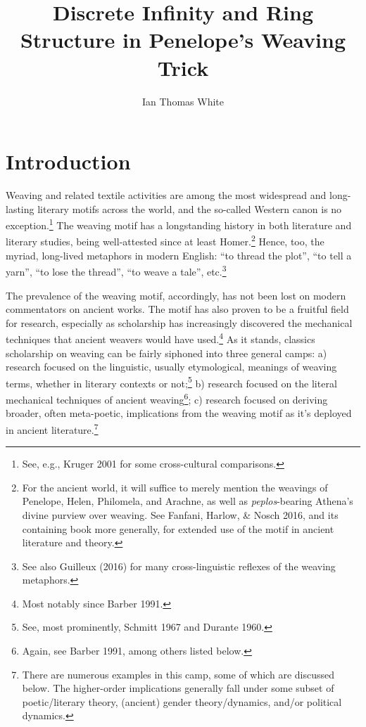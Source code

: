 \documentclass[12pt]{article}
\title{Discrete Infinity and Ring Structure in Penelope's Weaving Trick}
\author{Ian Thomas White}
\date{}
\makeatletter
\renewcommand{\maketitle}
{
\begin{flushleft}
\textbf{{\large\@title}}
\newline
\@author
\end{flushleft}
}
\makeatother
\begin{document}
\thispagestyle{empty}

\begin{singlespacing}
\maketitle
\tableofcontents
\end{singlespacing}

\newpage

\section{Introduction}\label{intro}

Weaving and related textile activities are among the most widespread and long-lasting literary motifs across the world, and the so-called Western canon is no exception.\footnote{ See, e.g., Kruger 2001 for some cross-cultural comparisons.} The weaving motif has a longstanding history in both literature and literary studies, being well-attested since at least Homer.\footnote{ For the ancient world, it will suffice to merely mention the weavings of Penelope, Helen, Philomela, and Arachne, as well as \textit{peplos}-bearing Athena's divine purview over weaving. See Fanfani, Harlow, \& Nosch 2016, and its containing book more generally, for extended use of the motif in ancient literature and theory.} Hence, too, the myriad, long-lived metaphors in modern English: ``to thread the plot'', ``to tell a yarn'', ``to lose the thread'', ``to weave a tale'', etc.\footnote{ See also Guilleux (2016) for many cross-linguistic reflexes of the weaving metaphors.}

The prevalence of the weaving motif, accordingly, has not been lost on modern commentators on ancient works. The motif has also proven to be a fruitful field for research, especially as scholarship has increasingly discovered the mechanical techniques that ancient weavers would have used.\footnote{ Most notably since Barber 1991.} As it stands, classics scholarship on weaving can be fairly siphoned into three general camps: a) research focused on the linguistic, usually etymological, meanings of weaving terms, whether in literary contexts or not;\footnote{ See, most prominently, Schmitt 1967 and Durante 1960.} b) research focused on the literal mechanical techniques of ancient weaving\footnote{ Again, see Barber 1991, among others listed below.}; c) research focused on deriving broader, often meta-poetic, implications from the weaving motif as it's deployed in ancient literature.\footnote{ There are numerous examples in this camp, some of which are discussed below. The higher-order implications generally fall under some subset of poetic/literary theory, (ancient) gender theory/dynamics, and/or political dynamics.} 
\end{document}
